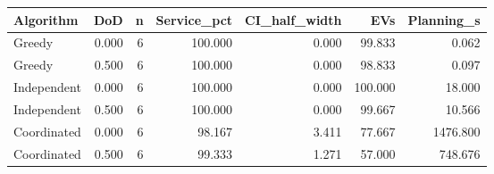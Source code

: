 \begin{tabular}{lrrrrrr}
\toprule
Algorithm & DoD & n & Service\_pct & CI\_half\_width & EVs & Planning\_s \\
\midrule
Greedy & 0.000 & 6 & 100.000 & 0.000 & 99.833 & 0.062 \\
Greedy & 0.500 & 6 & 100.000 & 0.000 & 98.833 & 0.097 \\
Independent & 0.000 & 6 & 100.000 & 0.000 & 100.000 & 18.000 \\
Independent & 0.500 & 6 & 100.000 & 0.000 & 99.667 & 10.566 \\
Coordinated & 0.000 & 6 & 98.167 & 3.411 & 77.667 & 1476.800 \\
Coordinated & 0.500 & 6 & 99.333 & 1.271 & 57.000 & 748.676 \\
\bottomrule
\end{tabular}
